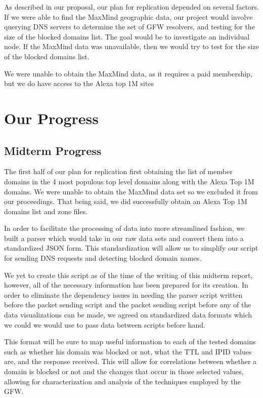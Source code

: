 \documentclass[format=acmsmall, screen=true]{acmart}
\begin{document}
As described in our proposal, our plan for replication depended on several factors. If we were able to find the MaxMind geographic data, our project would involve querying DNS servers to determine the set of GFW resolvers, and testing for the size of the blocked domains list. The goal would be to investigate an individual node. If the MaxMind data was unavailable, then we would try to test for the size of the blocked domains list. 

We were unable to obtain the MaxMind data, as it requires a paid membership, but we do have access to the Alexa top 1M sites


\section{Our Progress}



\subsection{Midterm Progress}

The first half of our plan for replication first obtaining the list of member domains in the 4 most populous top level domains along with the Alexa Top 1M domains. We were unable to obtain the MaxMind data set so we excluded it from our proceedings. That being said, we did successfully obtain an Alexa Top 1M domains list and zone files. 

In order to facilitate the processing of data into more streamlined fashion, we built a parser which would take in our raw data sets and convert them into a standardized JSON form. This standardization will allow us to simplify our script for sending DNS requests and detecting blocked domain names. 

We yet to create this script as of the time of the writing of this midterm report, however, all of the necessary information has been prepared for its creation. In order to eliminate the dependency issues in needing the parser script written before the packet sending script and the packet sending script before any of the data visualizations can be made, we agreed on standardized data formats which we could we would use to pass data between scripts before hand.

This format will be sure to map useful information to each of the tested domains such as whether his domain was blocked or not, what the TTL and IPID values are, and the response received. This will allow for correlations between whether a domain is blocked or not and the changes that occur in those selected values, allowing for characterization and analysis of the techniques employed by the GFW. 
\end{document}
